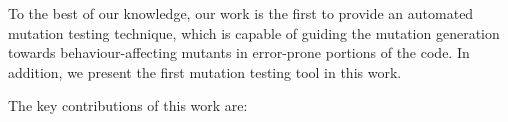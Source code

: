 To the best of our knowledge, our work is the first to provide an automated mutation testing technique, %
which is capable of guiding the mutation generation towards behaviour-affecting mutants in error-prone portions of the code. 
In addition, we present the first \javascript mutation testing tool in this work.

The key contributions of this work are:

